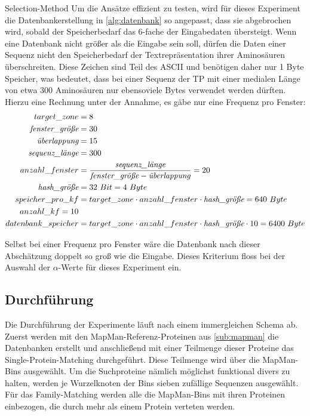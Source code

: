 \begin{experiment}{Selection-Method}
        Um die Ansätze effizient zu testen, wird für dieses Experiment die Datenbankerstellung in \autoref{alg:datenbank} so angepasst, dass sie abgebrochen wird, sobald der Speicherbedarf das 6-fache der Eingabedaten übersteigt. Wenn eine Datenbank nicht größer als die Eingabe sein soll, dürfen die Daten einer Sequenz nicht den Speicherbedarf der Textrepräsentation ihrer Aminosäuren überschreiten. Diese Zeichen sind Teil des \ac{ASCII} und benötigen daher nur 1 Byte Speicher, was bedeutet, dass bei einer Sequenz der \ac{TP} mit einer medialen Länge von etwa 300 Aminosäuren nur ebensoviele Bytes verwendet werden dürften. Hierzu eine Rechnung unter der Annahme, es gäbe nur eine Frequenz pro Fenster:
        \begin{equation}
            \begin{split}
                target\_zone &= 8\\
                \emph{fenster\_größe} &= 30\\
                \emph{überlappung} &= 15\\
                \emph{sequenz\_länge} &= 300\\
                anzahl\_fenster &= \frac{\emph{sequenz\_länge}}{\emph{fenster\_größe} - \emph{überlappung}} = 20\\
                \emph{hash\_größe} &= 32\ Bit = 4\ Byte\\
                speicher\_pro\_kf &= target\_zone \cdot anzahl\_fenster \cdot \emph{hash\_größe} = 640\ Byte\\
                anzahl\_kf = 10\\
                datenbank\_speicher &= target\_zone \cdot anzahl\_fenster \cdot \emph{hash\_größe} \cdot 10 = 6400\ Byte
            \end{split}
        \end{equation}

        Selbst bei einer Frequenz pro Fenster wäre die Datenbank nach dieser Abschätzung doppelt so groß wie die Eingabe. Dieses Kriterium floss bei der Auswahl der $\alpha$-Werte für dieses Experiment ein.
    \end{experiment}
    \subsection{Durchführung} %
        \label{sub:durchführung}
        Die Durchführung der Experimente läuft nach einem immergleichen Schema ab. Zuerst werden mit den MapMan-Referenz-Proteinen aus \autoref{sub:mapman} die Datenbanken erstellt und anschließend mit einer Teilmenge dieser Proteine das Single-Protein-Matching durchgeführt. Diese Teilmenge wird über die MapMan-Bins ausgewählt. Um die Suchproteine nämlich möglichst funktional divers zu halten, werden je Wurzelknoten der Bins sieben zufällige Sequenzen ausgewählt. Für das Family-Matching werden alle die MapMan-Bins mit ihren Proteinen einbezogen, die durch mehr als einem Protein verteten werden.

